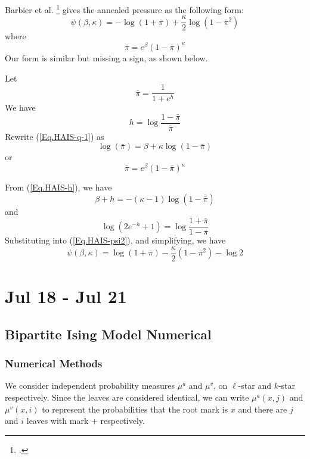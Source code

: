 \documentclass[12pt]{article}
\numberwithin{equation}{section}
\begin{document}
Barbier et al. \footcite{barbier_hard-core_2013} gives the annealed pressure as the following form:
\begin{equation}
    \psi(\beta, \kappa) = -\log(1+\bar{\pi})+\frac\kappa2\log(1-\bar{\pi}^2)
\end{equation}
where
\begin{equation*}
    \bar{\pi} = e^\beta (1-\bar{\pi})^\kappa
\end{equation*}
Our form is similar but missing a sign, as shown below.

Let
\begin{equation}
    \bar{\pi} = \frac{1}{1+e^h}
\end{equation}
We have
\begin{equation*}
    h = \log\frac{1-\bar{\pi}}{\bar{\pi}}
\end{equation*}
Rewrite (\ref{Eq.HAIS-q-1}) as
\begin{equation}
    \log(\bar{\pi}) = \beta + \kappa \log(1 - \bar{\pi})
\end{equation}
or
\begin{equation}
    \bar{\pi} = e^\beta(1 - \bar{\pi})^\kappa
\end{equation}

From (\ref{Eq.HAIS-h}), we have
\begin{equation*}
    \beta + h = -(\kappa-1)\log(1-\bar{\bar{\pi}})
\end{equation*}
and
\begin{equation*}
    \log(2e^{-h}+1) = \log\frac{1+\bar{\pi}}{1-\bar{\pi}}
\end{equation*}
Substituting into (\ref{Eq.HAIS-psi2}), and simplifying, we have
\begin{equation}
    \psi(\beta, \kappa) = \log(1+\bar{\pi}) - \frac\kappa2\left(1-\bar{\pi}^2\right) - \log 2
\end{equation}

\newpage

\section{Jul 18 - Jul 21}

\subsection{Bipartite Ising Model Numerical}

\subsubsection{Numerical Methods}
We consider independent probability measures $\mu^a$ and $\mu^v$, on $\ell$-star and $k$-star respectively.
Since the leaves are considered identical, we can write $\mu^a(x, j)$ and $\mu^v(x, i)$ to represent the probabilities
that the root mark is $x$ and there are $j$ and $i$ leaves with mark $+$ respectively.
\end{document}
